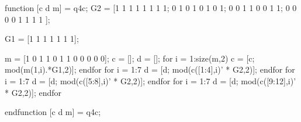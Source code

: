 \begin{comment}
Algorithm:

Suppose that $C_1$ is a binary linear $[n_1=7 , k_1=1 , d_1=7 ]$-code and that $C_2$ is a binary linear $[n_2=8 ,k_2= 4 , d_2=4 ]$-code.
Cross-interleaving of $C_1$ with $C_2$ is performed as follows.
\begin{itemize}
\item[1]
Encode the message using $C_1$ and interleave this code to depth $k_2=4$.

As described above, this means that within each set of $k_2=4$
codewords (each codeword having length $n_1=7$), we form $n_1=7$ vectors of length $k_2=4$
by taking all the first coordinates, all the second coordinates, and so on. 
\item[2]
Each such vector (of length $k_2=4$) can now be regarded as a message and encoded
using the code $C_2$. The resulting codewords of $C_2$ can then be interleaved to
any desired depth, say $s=3$.
\end{itemize}

Suppose that $C_1$ is the binary repetition code with generator matrix
\[
	G_1 = \begin{pmatrix}
	1 & 1 & 1 & 1 & 1 & 1 & 1
	\end{pmatrix}.
\]
Note that $C_1$ is a binary $[7,1,7]$ repetition code.

Suppose that $C_2$ is the code $RM(1,3)$ with generator matrix
\[
	G_2 = \begin{pmatrix}
	1 & 1 & 1 & 1 & 1 & 1 & 1 & 1 \\ 
	0 & 1 & 0 & 1 & 0 & 1 & 0 & 1 \\ 
	0 & 0 & 1 & 1 & 0 & 0 & 1 & 1 \\ 
	0 & 0 & 0 & 0 & 1 & 1 & 1 & 1
	\end{pmatrix} 
\]
Note that $RM(1,3)$ is a binary linear $[8,4,4]$-code.
\end{comment}
\begin{octavecode}
function [c d m] = q4c;
  G2 = [1 1 1 1 1 1 1 1;
        0 1 0 1 0 1 0 1;
        0 0 1 1 0 0 1 1;
        0 0 0 0 1 1 1 1
       ];
       
  G1 = [1 1 1 1 1 1 1];
  
  m  = [1 0 1 1  0 1 1 0   0 0 0 0];
  c  = [];
  d  = [];
  for i = 1:size(m,2)
    c = [c; mod(m(1,i).*G1,2)];
  endfor
  for i = 1:7
  	d = [d; mod(c([1:4],i)' * G2,2)];
  endfor
  for i = 1:7
  	d = [d; mod(c([5:8],i)' * G2,2)];
  endfor
  for i = 1:7
  	d = [d; mod(c([9:12],i)' * G2,2)];
  endfor

endfunction
[c d m] = q4c;
\end{octavecode}
